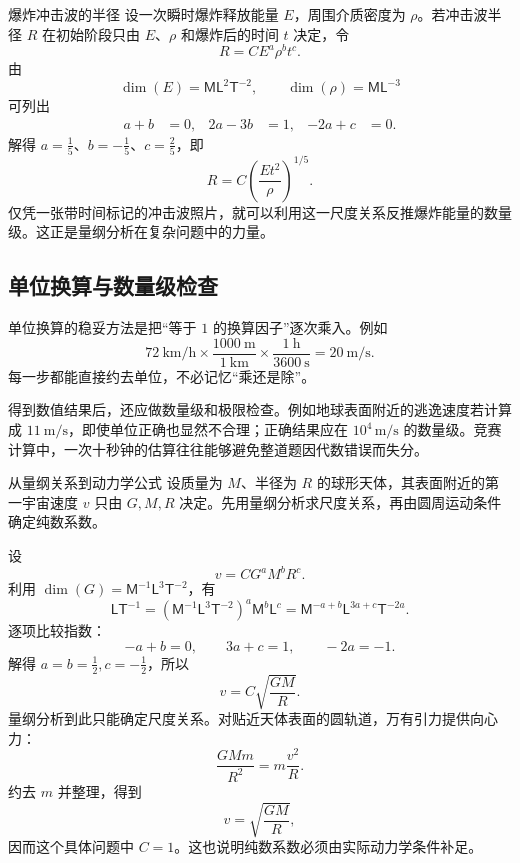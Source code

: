 \documentclass[UTF8,zihao=-4,oneside,openany]{ctexbook}
\numberwithin{equation}{section}
\newcommand{\dimens}[1]{\operatorname{dim}\!\left(#1\right)}
\begin{document}
\begin{extensionbox}{爆炸冲击波的半径}
设一次瞬时爆炸释放能量 $E$，周围介质密度为 $\rho$。若冲击波半径 $R$ 在初始阶段只由 $E$、$\rho$ 和爆炸后的时间 $t$ 决定，令
\[
  R=CE^a\rho^bt^c.
\]
由
\[
  \dimens{E}=\mathsf{ML}^{2}\mathsf{T}^{-2},\qquad
  \dimens{\rho}=\mathsf{ML}^{-3}
\]
可列出
\[
  \begin{aligned}
    a+b&=0, & 2a-3b&=1, & -2a+c&=0.
  \end{aligned}
\]
解得 $a=\frac15$、$b=-\frac15$、$c=\frac25$，即
\[
  R=C\left(\frac{Et^2}{\rho}\right)^{1/5}.
\]
仅凭一张带时间标记的冲击波照片，就可以利用这一尺度关系反推爆炸能量的数量级。这正是量纲分析在复杂问题中的力量。
\end{extensionbox}

\subsection{单位换算与数量级检查}

单位换算的稳妥方法是把“等于 $1$ 的换算因子”逐次乘入。例如
\[
\SI{72}{\kilo\metre\per\hour}
\times\frac{\SI{1000}{\metre}}{\SI{1}{\kilo\metre}}
\times\frac{\SI{1}{\hour}}{\SI{3600}{\second}}
=\SI{20}{\metre\per\second}.
\]
每一步都能直接约去单位，不必记忆“乘还是除”。

得到数值结果后，还应做数量级和极限检查。例如地球表面附近的逃逸速度若计算成 $\SI{11}{\metre\per\second}$，即使单位正确也显然不合理；正确结果应在 $10^4\,\si{\metre\per\second}$ 的数量级。竞赛计算中，一次十秒钟的估算往往能够避免整道题因代数错误而失分。

\begin{examplebox}{从量纲关系到动力学公式}
设质量为 $M$、半径为 $R$ 的球形天体，其表面附近的第一宇宙速度 $v$ 只由
$G,M,R$ 决定。先用量纲分析求尺度关系，再由圆周运动条件确定纯数系数。

\tcblower
设
\[
  v=CG^aM^bR^c.
\]
利用 $\dimens{G}=\mathsf{M}^{-1}\mathsf{L}^3\mathsf{T}^{-2}$，有
\[
  \mathsf{LT}^{-1}
  =(\mathsf{M}^{-1}\mathsf{L}^3\mathsf{T}^{-2})^a
   \mathsf{M}^b\mathsf{L}^c
  =\mathsf{M}^{-a+b}\mathsf{L}^{3a+c}\mathsf{T}^{-2a}.
\]
逐项比较指数：
\[
  -a+b=0,\qquad 3a+c=1,\qquad -2a=-1.
\]
解得 $a=b=\frac12,c=-\frac12$，所以
\[
  v=C\sqrt{\frac{GM}{R}}.
\]
量纲分析到此只能确定尺度关系。对贴近天体表面的圆轨道，万有引力提供向心力：
\[
  \frac{GMm}{R^2}=m\frac{v^2}{R}.
\]
约去 $m$ 并整理，得到
\[
  v=\sqrt{\frac{GM}{R}},
\]
因而这个具体问题中 $C=1$。这也说明纯数系数必须由实际动力学条件补足。
\end{examplebox}
\end{document}
